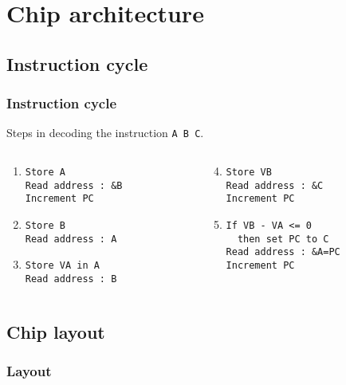 \documentclass{beamer}
\begin{document}
\section{Chip architecture}
\subsection{Instruction cycle}

\begin{frame}[fragile]
  \frametitle{Instruction cycle}
  Steps in decoding the instruction \verb=A B C=.
  \begin{columns}[t]
    \begin{column}[T]{4cm}
      \begin{enumerate}
        \setcounter{enumi}{0}
        \item
          \begin{verbatim}
Store A
Read address : &B
Increment PC
          \end{verbatim}
        \item
          \begin{verbatim}
Store B
Read address : A
          \end{verbatim}
        \item
	  \begin{verbatim}
Store VA in A
Read address : B
          \end{verbatim}
      \end{enumerate}
    \end{column}
    \begin{column}[T]{6cm}
      \begin{enumerate}
      \setcounter{enumi}{3}
        \item
          \begin{verbatim}
Store VB
Read address : &C
Increment PC
          \end{verbatim}
        \item 
          \begin{verbatim}
If VB - VA <= 0
  then set PC to C
Read address : &A=PC
Increment PC
          \end{verbatim}
      \end{enumerate}
    \end{column}
  \end{columns}
\end{frame}

\subsection{Chip layout}
\begin{frame}
    \frametitle{Layout}
    \centering
    
\end{frame}
\end{document}
